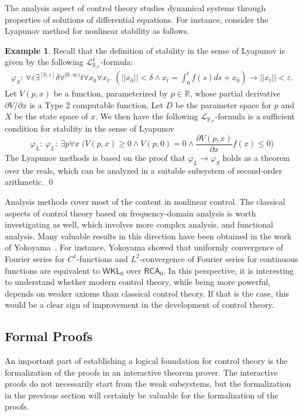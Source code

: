 \documentclass[10pt]{article}
\newcommand{\lrf}{\mathcal{L}_{\mathbb{R}_{\mathcal{F}}}}
\theoremstyle{definition}
\newtheorem{example}{Example}[section]
\begin{document}
The analysis aspect of control theory studies dynamical systems through properties of solutions of differential equations. For instance, consider the Lyapunov method for nonlinear stability as follows. 
\begin{example}
Recall that the definition of stability in the sense of Lyapunov is given by the following $\lrf^1$-formula:
\begin{eqnarray*}
\varphi_S:\ \forall\varepsilon\exists^{[0,\varepsilon]} \delta \forall^{[0,\infty)} t\forall x_0\forall x_t .\; (||x_0||<\delta \wedge x_t = \int_0^t f(s)ds + x_0 )\rightarrow ||x_t||<\varepsilon.
\end{eqnarray*}
Let $V(p,x)$ be a function, parameterized by $p\in \mathbb{R}$, whose partial derivative ${\partial V}/{\partial x}$ is a Type 2 computable function. Let $D$ be the parameter space for $p$ and $X$ be the state space of $x$. We then have the following $\lrf$-formula is a sufficient condition for stability in the sense of Lyapunov
$$\varphi_L:\ \varphi_L:\ \exists p\forall x\; \bigg(V(p,x)\geq 0 \wedge V(p,0) = 0\wedge \frac{\partial V(p,x)}{\partial x}f(x)\leq 0\bigg)$$
The Lyapunov methods is based on the proof that $\varphi_L\rightarrow \varphi_S$ holds as a theorem over the reals, which can be analyzed in a suitable subsystem of second-order arithmetic. \qed
\end{example}
Analysis methods cover most of the content in nonlinear control. The classical aspects of control theory based on frequency-domain analysis is worth investigating as well, which involves more complex analysis, and functional analysis. Many valuable results in this direction have been obtained in the work of Yokoyama~\cite{yoko}. For instance, Yokoyama showed that uniformly convergence of Fourier series for $C^1$-functions and $L^2$-convergence of Fourier series for continuous functions are equivalent to $\mathsf{WKL}_0$ over $\mathsf{RCA}_0$. In this perspective, it is interesting to understand whether modern control theory, while being more powerful, depends on weaker axioms than classical control theory. If that is the case, this would be a clear sign of improvement in the development of control theory. 

\subsection{Formal Proofs}

An important part of establishing a logical foundation for control theory is the formalization of the proofs in an interactive theorem prover. The interactive proofs do not necessarily start from the weak subsystems, but the formalization in the previous section will certainly be valuable for the formalization of the proofs. 
\end{document}
